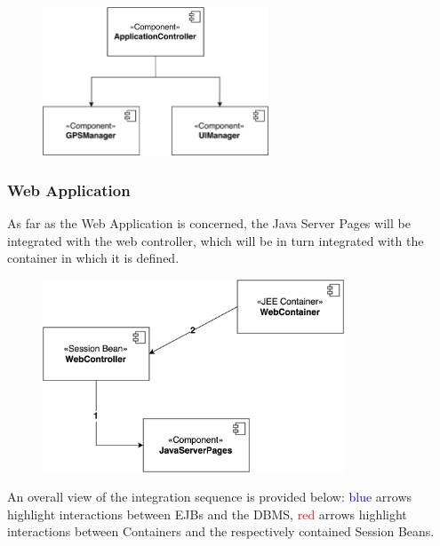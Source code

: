 \begin{figure}[H]
\begin{center}
		\includegraphics[width=0.6\textwidth]{./integration_strategy/diagrams/mobile.png}
\end{center}
\end{figure}

\subsubsection{Web Application}
As far as the Web Application is concerned, the Java Server Pages will be integrated with the web controller, which will be in turn integrated with the container in which it is defined.

\begin{figure}[H]
\begin{center}
		\includegraphics[width=0.8\textwidth]{./integration_strategy/diagrams/web.png}
\end{center}
\end{figure}

\noindent
An overall view of the integration sequence is provided below: \textcolor{blue}{blue} arrows highlight interactions between EJBs and the DBMS, \textcolor{red}{red} arrows highlight interactions between Containers and the respectively contained Session Beans.

